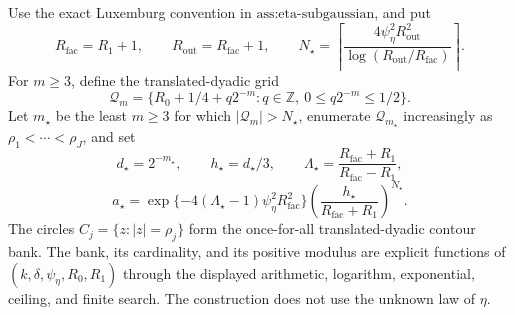 Use the exact Luxemburg convention in \(\text{ass:eta-subgaussian}\), and put
\[
 R_{\mathrm{fac}}=R_1+1,
 \qquad R_{\mathrm{out}}=R_{\mathrm{fac}}+1,
 \qquad
 N_{\star}=\left\lceil
 \frac{4\psi_{\eta}^2R_{\mathrm{out}}^2}
      {\log(R_{\mathrm{out}}/R_{\mathrm{fac}})}
 \right\rceil.
\]
For \(m\ge3\), define the translated-dyadic grid
\[
 \mathcal Q_m=
 \{R_0+1/4+q2^{-m}:q\in\mathbb Z,\ 0\le q2^{-m}\le1/2\}.
\]
Let \(m_{\star}\) be the least \(m\ge3\) for which \(|\mathcal Q_m|>N_{\star}\), enumerate \(\mathcal Q_{m_{\star}}\) increasingly as \(\rho_1<\cdots<\rho_J\), and set
\[
 d_{\star}=2^{-m_{\star}},\qquad h_{\star}=d_{\star}/3,
 \qquad
 \Lambda_{\star}=\frac{R_{\mathrm{fac}}+R_1}{R_{\mathrm{fac}}-R_1},
\]
\[
 a_{\star}=
 \exp\{-4(\Lambda_{\star}-1)\psi_{\eta}^2R_{\mathrm{fac}}^2\}
 \left(\frac{h_{\star}}{R_{\mathrm{fac}}+R_1}\right)^{N_{\star}}.
\]
The circles \(C_j=\{z:|z|=\rho_j\}\) form the once-for-all translated-dyadic contour bank.  The bank, its cardinality, and its positive modulus are explicit functions of \((k,\delta,\psi_{\eta},R_0,R_1)\) through the displayed arithmetic, logarithm, exponential, ceiling, and finite search.  The construction does not use the unknown law of \(\eta\).